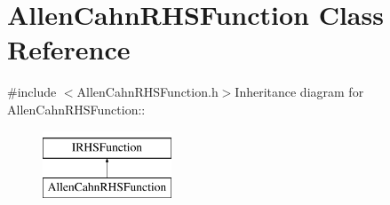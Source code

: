 \hypertarget{classAllenCahnRHSFunction}{
\section{AllenCahnRHSFunction Class Reference}
\label{classAllenCahnRHSFunction}
}


{\ttfamily \#include $<$AllenCahnRHSFunction.h$>$}Inheritance diagram for AllenCahnRHSFunction::\begin{figure}[H]
\begin{center}
\leavevmode
\includegraphics[height=2cm]{classAllenCahnRHSFunction}
\end{center}
\end{figure}
